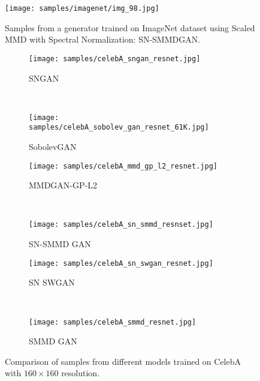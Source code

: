 \documentclass{article}
\begin{document}
\begin{figure}
        \centering
        \texttt{[image: samples/imagenet/img\_98.jpg]}
        \caption{Samples from a generator trained on ImageNet dataset using Scaled MMD with Spectral Normalization: SN-SMMDGAN.  }
       \label{fig:imagenet_additional}
\end{figure}

\begin{figure}[ht!]
    \centering
    \begin{subfigure}[t]{0.48\textwidth}
        \centering
        \texttt{[image: samples/celebA\_sngan\_resnet.jpg]}
        \caption{SNGAN} \label{fig:celebA_sngan:samples}
    \end{subfigure}
    ~
    \begin{subfigure}[t]{0.48\textwidth}
        \centering
        \texttt{[image: samples/celebA\_sobolev\_gan\_resnet\_61K.jpg]}
        \caption{SobolevGAN} \label{fig:celebA_sobolev_gan:samples}
    \end{subfigure}
   \vspace{0cm}
    \begin{subfigure}[t]{0.48\textwidth}
        \centering
        \texttt{[image: samples/celebA\_mmd\_gp\_l2\_resnet.jpg]}
        \caption{MMDGAN-GP-L2} \label{fig:celebA_mmd_gp_l:samples}
    \end{subfigure}
    ~
    \begin{subfigure}[t]{0.48\textwidth}
        \centering
        \texttt{[image: samples/celebA\_sn\_smmd\_resnset.jpg]}
        \caption{SN-SMMD GAN} \label{fig:celebA_sn_smmd:samples}
    \end{subfigure}
     \vspace{0cm}
    \begin{subfigure}[t]{0.48\textwidth}
        \centering
        \texttt{[image: samples/celebA\_sn\_swgan\_resnet.jpg]}
        \caption{SN SWGAN} \label{fig:celebA_sn_swgan:samples}
    \end{subfigure}
    ~
    \begin{subfigure}[t]{0.48\textwidth}
        \centering
        \texttt{[image: samples/celebA\_smmd\_resnet.jpg]}
        \caption{SMMD GAN} \label{fig:celebA_smmd:samples}
    \end{subfigure}
    \caption{Comparison of samples from different models trained on CelebA with $160\times 160$ resolution.}
    \label{fig:celebA_samples_additional}
\end{figure}
\end{document}

